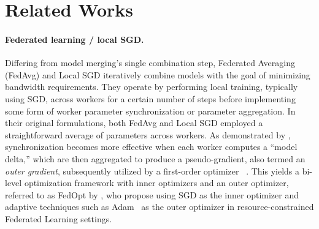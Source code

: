 \section{Related Works}\label{sec:related_works}



\paragraph{Federated learning / local SGD.}  Differing from model merging's single combination step, Federated Averaging (FedAvg) \citep{mcmahan2017fedavg} and Local SGD \citep{stich2019local} iteratively combine models with the goal of minimizing bandwidth requirements. They operate by performing local training, typically using SGD, across workers for a certain number of steps before implementing some form of worker parameter synchronization or parameter aggregation.  In their original formulations, both FedAvg and Local SGD employed a straightforward average of parameters across workers.  As demonstrated by \cite{reddi2021adaptive}, synchronization becomes more effective when each worker computes a ``model delta,'' which are then aggregated to produce a pseudo-gradient, also termed an \textit{outer gradient}, subsequently utilized by a first-order optimizer ~\citep{reddi2021adaptive,ilharco2022patching}.  This yields a bi-level optimization framework with inner optimizers and an outer optimizer, referred to as FedOpt by \cite{reddi2021adaptive}, who propose using SGD as the inner optimizer and adaptive techniques such as Adam~\citep{kingma2014adam} as the outer optimizer in resource-constrained Federated Learning settings.

